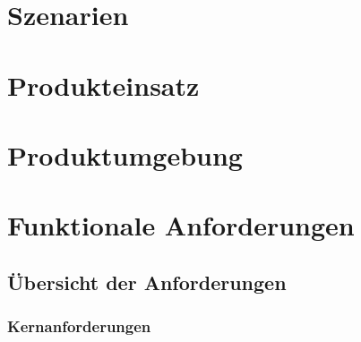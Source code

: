 \documentclass[a4paper,12pt]{article}
\begin{document}

\section{Szenarien}

\section{Produkteinsatz}

\section{Produktumgebung}

\section{Funktionale Anforderungen}

\subsection{Übersicht der Anforderungen}

\subsubsection{Kernanforderungen} %
\end{document}
